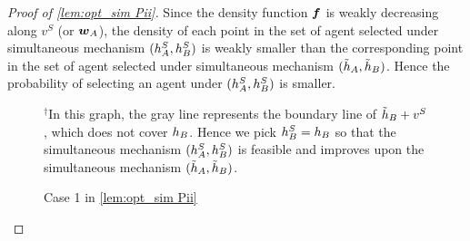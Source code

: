 \begin{proof}[Proof of \cref{lem:opt_sim Pii}]
    Since the density function $\boldsymbol{f}$ is weakly decreasing along $v^S$ (or $\boldsymbol{w}_A$), the density of each point in the set of agent selected under simultaneous mechanism $(h_A^S,h_B^S)$ is weakly smaller than the corresponding point in the set of agent selected under simultaneous mechanism $(\tilde{h}_A,\tilde{h}_B)$.
    Hence the probability of selecting an agent under  $(h_A^S,h_B^S)$ is smaller.



\begin{figure}[t]
\centering
{}
\caption{Case 1 in \cref{lem:opt_sim Pii}}
\label{fig: Pii case 1}
\rule{0in}{1.2em}$^\dag$\scriptsize In this graph, the gray line represents the boundary line of $\tilde{h}_B+v^S$, which does not cover
$h_B$. Hence we pick $h_B^S=h_B$ so that  the simultaneous mechanism $(h_A^S,h_B^S)$ is feasible and improves upon the simultaneous mechanism $(\tilde{h}_A,\tilde{h}_B)$.
\end{figure}




\end{proof}
